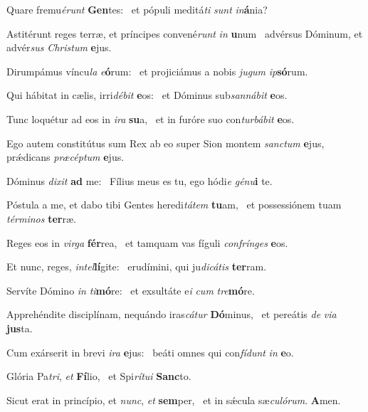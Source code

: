 \item Quare fremu\textit{érunt} \textbf{Gen}tes:~\psstar{} et pópuli meditá\textit{ti} \textit{sunt} \textit{in}\textbf{á}nia?
\item Astitérunt reges terræ, et príncipes convené\textit{runt} \textit{in} \textbf{u}num~\psstar{} advérsus Dóminum, et advér\textit{sus} \textit{Christum} \textbf{e}jus.
\item Dirumpámus víncu\textit{la} \textit{e}\textbf{ó}rum:~\psstar{} et projiciámus a nobis \textit{jugum} \textit{ip}\textbf{só}rum.
\item Qui hábitat in cælis, irri\textit{débit} \textbf{e}os:~\psstar{} et Dóminus sub\textit{sannábit} \textbf{e}os.
\item Tunc loquétur ad eos in \textit{ira} \textbf{su}a,~\psstar{} et in furóre suo con\textit{turbábit} \textbf{e}os.
\item Ego autem constitútus sum Rex ab eo super Sion montem \textit{sanctum} \textbf{e}jus,~\psstar{} prǽdicans \textit{præcéptum} \textbf{e}jus.
\item Dóminus \textit{dixit} \textbf{ad} me:~\psstar{} Fílius meus es tu, ego hódi\textit{e} \textit{génu}\textbf{i} te.
\item Póstula a me, et dabo tibi Gentes heredi\textit{tátem} \textbf{tu}am,~\psstar{} et possessiónem tuam \textit{términos} \textbf{ter}ræ.
\item Reges eos in \textit{virga} \textbf{fér}rea,~\psstar{} et tamquam vas fíguli \textit{confrínges} \textbf{e}os.
\item Et nunc, reges, \textit{intel}\textbf{lí}gite:~\psstar{} erudímini, qui ju\textit{dicátis} \textbf{ter}ram.
\item Servíte Dómino \textit{in} \textit{ti}\textbf{mó}re:~\psstar{} et exsultáte e\textit{i} \textit{cum} \textit{tre}\textbf{mó}re.
\item Apprehéndite disciplínam, nequándo iras\textit{cátur} \textbf{Dó}minus,~\psstar{} et pereátis \textit{de} \textit{via} \textbf{jus}ta.
\item Cum exárserit in brevi \textit{ira} \textbf{e}jus:~\psstar{} beáti omnes qui con\textit{fídunt} \textit{in} \textbf{e}o.
\item Glória Pa\textit{tri}, \textit{et} \textbf{Fí}lio,~\psstar{} et Spi\textit{rítui} \textbf{Sanc}to.
\item Sicut erat in princípio, et \textit{nunc}, \textit{et} \textbf{sem}per,~\psstar{} et in sǽcula sæ\textit{culórum}. \textbf{A}men.
